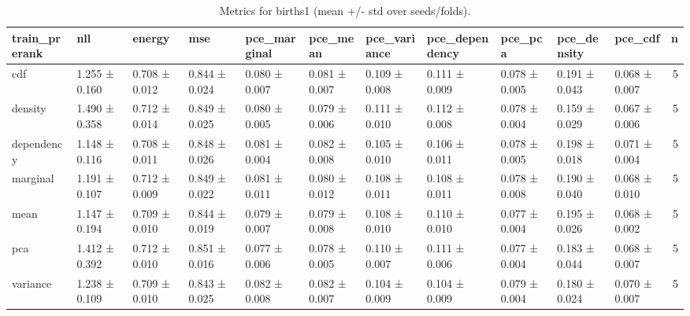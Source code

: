 \begin{table}
\caption{Metrics for births1 (mean +/- std over seeds/folds).}
\label{tab:metrics_summary_births1}
\begin{tabular}{lllllllllllr}
\toprule
train_prerank & nll & energy & mse & pce_marginal & pce_mean & pce_variance & pce_dependency & pce_pca & pce_density & pce_cdf & n \\
\midrule
cdf & 1.255 ± 0.160 & 0.708 ± 0.012 & 0.844 ± 0.024 & 0.080 ± 0.007 & 0.081 ± 0.007 & 0.109 ± 0.008 & 0.111 ± 0.009 & 0.078 ± 0.005 & 0.191 ± 0.043 & 0.068 ± 0.007 & 5 \\
density & 1.490 ± 0.358 & 0.712 ± 0.014 & 0.849 ± 0.025 & 0.080 ± 0.005 & 0.079 ± 0.006 & 0.111 ± 0.010 & 0.112 ± 0.008 & 0.078 ± 0.004 & 0.159 ± 0.029 & 0.067 ± 0.006 & 5 \\
dependency & 1.148 ± 0.116 & 0.708 ± 0.011 & 0.848 ± 0.026 & 0.081 ± 0.004 & 0.082 ± 0.008 & 0.105 ± 0.010 & 0.106 ± 0.011 & 0.078 ± 0.005 & 0.198 ± 0.018 & 0.071 ± 0.004 & 5 \\
marginal & 1.191 ± 0.107 & 0.712 ± 0.009 & 0.849 ± 0.022 & 0.081 ± 0.011 & 0.080 ± 0.012 & 0.108 ± 0.011 & 0.108 ± 0.011 & 0.078 ± 0.008 & 0.190 ± 0.040 & 0.068 ± 0.010 & 5 \\
mean & 1.147 ± 0.194 & 0.709 ± 0.010 & 0.844 ± 0.019 & 0.079 ± 0.007 & 0.079 ± 0.008 & 0.108 ± 0.010 & 0.110 ± 0.010 & 0.077 ± 0.004 & 0.195 ± 0.026 & 0.068 ± 0.002 & 5 \\
pca & 1.412 ± 0.392 & 0.712 ± 0.010 & 0.851 ± 0.016 & 0.077 ± 0.006 & 0.078 ± 0.005 & 0.110 ± 0.007 & 0.111 ± 0.006 & 0.077 ± 0.004 & 0.183 ± 0.044 & 0.068 ± 0.007 & 5 \\
variance & 1.238 ± 0.109 & 0.709 ± 0.010 & 0.843 ± 0.025 & 0.082 ± 0.008 & 0.082 ± 0.007 & 0.104 ± 0.009 & 0.104 ± 0.009 & 0.079 ± 0.004 & 0.180 ± 0.024 & 0.070 ± 0.007 & 5 \\
\bottomrule
\end{tabular}
\end{table}
